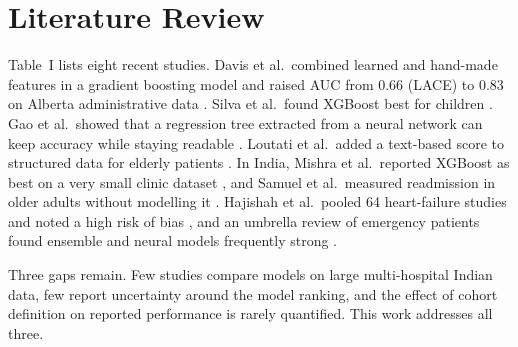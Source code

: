 \documentclass[conference,a4paper]{IEEEtran}
\begin{document}
\section{Literature Review}
Table~I lists eight recent studies. Davis et al.\ combined learned and hand-made features in a gradient boosting model and raised AUC from 0.66 (LACE) to 0.83 on Alberta administrative data \cite{davis}. Silva et al.\ found XGBoost best for children \cite{silva}. Gao et al.\ showed that a regression tree extracted from a neural network can keep accuracy while staying readable \cite{gao}. Loutati et al.\ added a text-based score to structured data for elderly patients \cite{loutati}. In India, Mishra et al.\ reported XGBoost as best on a very small clinic dataset \cite{mishra}, and Samuel et al.\ measured readmission in older adults without modelling it \cite{samuel}. Hajishah et al.\ pooled 64 heart-failure studies and noted a high risk of bias \cite{hajishah}, and an umbrella review of emergency patients found ensemble and neural models frequently strong \cite{alrazeeni}.

Three gaps remain. Few studies compare models on large multi-hospital Indian data, few report uncertainty around the model ranking, and the effect of cohort definition on reported performance is rarely quantified. This work addresses all three.
\end{document}
